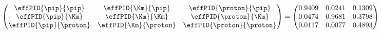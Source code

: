 \begin{align*}        
\begin{pmatrix}
    \effPID{\pip}{\pip}    & \effPID{\Km}{\pip}    & \effPID{\proton}{\pip} \\
    \effPID{\pip}{\Km}     & \effPID{\Km}{\Km}     & \effPID{\proton}{\Km} \\
    \effPID{\pip}{\proton} & \effPID{\Km}{\proton} & \effPID{\proton}{\proton} 
\end{pmatrix}
=
\begin{pmatrix}
0.9409 & 0.0241 & 0.1309 \\
 0.0474 & 0.9681 & 0.3798 \\
 0.0117 & 0.0077 & 0.4893
\end{pmatrix}
\end{align*}
